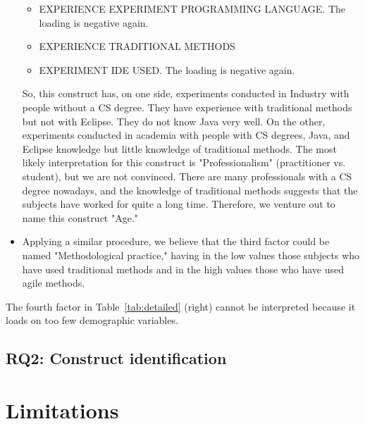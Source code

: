 \documentclass[10pt,conference]{IEEEtran}\usepackage[]{graphicx}\usepackage[table,xcdraw]{xcolor}
\begin{document}
\begin{itemize}
\begin{itemize}
        \item EXPERIENCE EXPERIMENT PROGRAMMING LANGUAGE. The loading is negative again.
        
        \item EXPERIENCE TRADITIONAL METHODS
        
        \item EXPERIMENT IDE USED. The loading is negative again.
    \end{itemize}
    
    So, this construct has, on one side, experiments conducted in Industry with people without a CS degree. They have experience with traditional methods but not with Eclipse. They do not know Java very well. On the other, experiments conducted in academia with people with CS degrees, Java, and Eclipse knowledge but little knowledge of traditional methods. The most likely interpretation for this construct is "Professionalism" (practitioner vs. student), but we are not convinced. There are many professionals with a CS degree nowadays, and the knowledge of traditional methods suggests that the subjects have worked for quite a long time. Therefore, we venture out to name this construct "Age."
    
    \item Applying a similar procedure, we believe that the third factor could be named "Methodological practice," having in the low values those subjects who have used traditional methods and in the high values those who have used agile methods. 

\end{itemize}

The fourth factor in Table~\ref{tab:detailed} (right) cannot be interpreted because it loads on too few demographic variables. 

\subsection{RQ2: Construct identification}

\section{Limitations}
\end{document}
